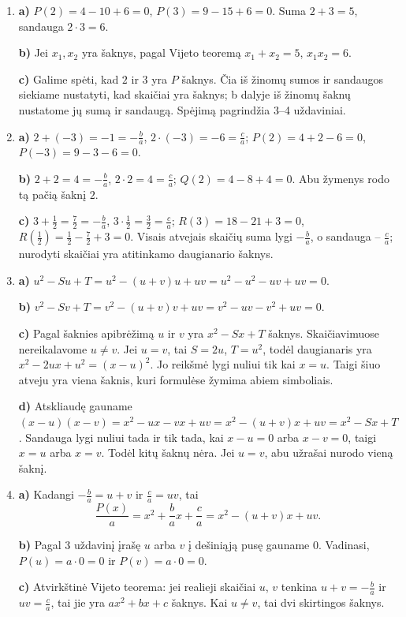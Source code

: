 \documentclass[12pt,a4paper]{article}
\begin{document}
\begin{enumerate}
\item \textbf{a)} $P(2)=4-10+6=0$, $P(3)=9-15+6=0$. Suma $2+3=5$, sandauga $2\cdot3=6$.

\textbf{b)} Jei $x_1,x_2$ yra šaknys, pagal Vijeto teoremą $x_1+x_2=5$, $x_1x_2=6$.

\textbf{c)} Galime spėti, kad $2$ ir $3$ yra $P$ šaknys. Čia iš žinomų sumos ir sandaugos siekiame nustatyti, kad skaičiai yra šaknys; b dalyje iš žinomų šaknų nustatome jų sumą ir sandaugą. Spėjimą pagrindžia 3–4 uždaviniai.
\item \textbf{a)} $2+(-3)=-1=-\frac{b}{a}$, $2\cdot(-3)=-6=\frac{c}{a}$; $P(2)=4+2-6=0$, $P(-3)=9-3-6=0$.

\textbf{b)} $2+2=4=-\frac{b}{a}$, $2\cdot2=4=\frac{c}{a}$; $Q(2)=4-8+4=0$. Abu žymenys rodo tą pačią šaknį $2$.

\textbf{c)} $3+\frac{1}{2}=\frac{7}{2}=-\frac{b}{a}$, $3\cdot\frac{1}{2}=\frac{3}{2}=\frac{c}{a}$; $R(3)=18-21+3=0$, $R(\frac{1}{2})=\frac{1}{2}-\frac{7}{2}+3=0$. Visais atvejais skaičių suma lygi $-\frac{b}{a}$, o sandauga – $\frac{c}{a}$; nurodyti skaičiai yra atitinkamo daugianario šaknys.
\item \textbf{a)} $u^2-Su+T=u^2-(u+v)u+uv=u^2-u^2-uv+uv=0$.

\textbf{b)} $v^2-Sv+T=v^2-(u+v)v+uv=v^2-uv-v^2+uv=0$.

\textbf{c)} Pagal šaknies apibrėžimą $u$ ir $v$ yra $x^2-Sx+T$ šaknys. Skaičiavimuose nereikalavome $u\ne v$. Jei $u=v$, tai $S=2u$, $T=u^2$, todėl daugianaris yra $x^2-2ux+u^2=(x-u)^2$. Jo reikšmė lygi nuliui tik kai $x=u$. Taigi šiuo atveju yra viena šaknis, kuri formulėse žymima abiem simboliais.

\textbf{d)} Atskliaudę gauname $(x-u)(x-v)=x^2-ux-vx+uv=x^2-(u+v)x+uv=x^2-Sx+T$. Sandauga lygi nuliui tada ir tik tada, kai $x-u=0$ arba $x-v=0$, taigi $x=u$ arba $x=v$. Todėl kitų šaknų nėra. Jei $u=v$, abu užrašai nurodo vieną šaknį.
\item \textbf{a)} Kadangi $-\frac{b}{a}=u+v$ ir $\frac{c}{a}=uv$, tai
\[\frac{P(x)}{a}=x^2+\frac{b}{a}x+\frac{c}{a}=x^2-(u+v)x+uv.\]

\textbf{b)} Pagal 3 uždavinį įrašę $u$ arba $v$ į dešiniąją pusę gauname $0$. Vadinasi, $P(u)=a\cdot0=0$ ir $P(v)=a\cdot0=0$.

\textbf{c)} Atvirkštinė Vijeto teorema: jei realieji skaičiai $u$, $v$ tenkina $u+v=-\frac{b}{a}$ ir $uv=\frac{c}{a}$, tai jie yra $ax^2+bx+c$ šaknys. Kai $u\ne v$, tai dvi skirtingos šaknys.


\end{enumerate}
\end{document}
